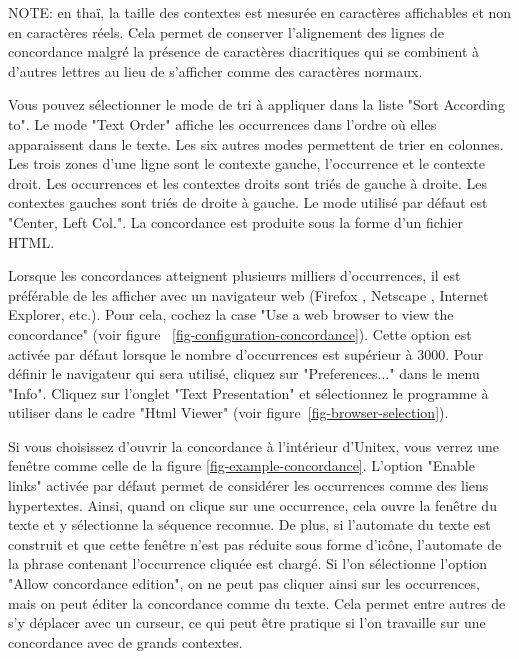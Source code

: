 \bigskip
\noindent NOTE: en thaï, la taille des contextes est mesurée en caractères affichables et non en
caractères réels. Cela permet de conserver l’alignement des lignes de concordance malgré la
présence de caractères diacritiques qui se combinent à d’autres lettres au lieu de s’afficher
comme des caractères normaux.


\bigskip
\noindent Vous pouvez sélectionner le mode de tri à appliquer dans la liste "Sort According to". Le
mode "Text Order" affiche les occurrences dans l’ordre où elles apparaissent dans le texte.
Les six autres modes permettent de trier en colonnes. Les trois zones d’une ligne sont le
contexte gauche, l’occurrence et le contexte droit. Les occurrences et les contextes droits
sont triés de gauche à droite. Les contextes gauches sont triés de droite à gauche. Le mode
utilisé par défaut est "Center, Left Col.". La concordance est produite sous la forme d’un
fichier HTML.

\bigskip
\noindent Lorsque les concordances atteignent plusieurs milliers d’occurrences, il est préférable
de les afficher avec un navigateur web (Firefox \cite{Firefox}, Netscape \cite{Netscape}, 
Internet Explorer, etc.).
\newline
Pour cela, cochez la case "Use a web browser to view the concordance" (voir figure
	~\ref{fig-configuration-concordance}). 
Cette option est activée par défaut lorsque le nombre d’occurrences est supérieur à 3000.
Pour définir le navigateur qui sera utilisé, cliquez sur "Preferences..." dans le menu "Info".
Cliquez sur l’onglet "Text Presentation" et sélectionnez le programme à utiliser dans le cadre
"Html Viewer" (voir figure~\ref{fig-browser-selection}).

\bigskip
\noindent {} Si vous choisissez d’ouvrir la concordance à l’intérieur
d’Unitex, vous verrez une fenêtre
comme celle de la figure \ref{fig-example-concordance}. 
L’option "Enable links" activée par défaut permet de considérer les occurrences comme des liens
hypertextes.
Ainsi, quand on clique sur une occurrence,
cela ouvre la fenêtre du texte et y sélectionne la séquence reconnue. De plus, si l’automate
du texte est construit et que cette fenêtre n’est pas réduite sous forme d’icône, l’automate
de la phrase contenant l’occurrence cliquée est chargé. Si l’on sélectionne l’option "Allow
concordance edition", on ne peut pas cliquer ainsi sur les occurrences, mais on peut éditer
la concordance comme du texte. Cela permet entre autres de s’y déplacer avec un curseur,
ce qui peut être pratique si l’on travaille sur une concordance avec de grands contextes.

